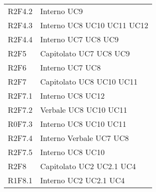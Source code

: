 \begin{center}
\begin{longtable}{  p{5cm} p{5cm} }
		R2F4.2 & Interno \newline UC9 \\
		R2F4.3 & Interno \newline UC8 \newline UC10 \newline UC11 \newline UC12 \\
		R2F4.4 & Interno \newline UC7 \newline UC8 \newline UC9 \\
		R2F5 & Capitolato \newline UC7 \newline UC8 \newline UC9 \\
		R2F6 & Interno \newline UC7 \newline UC8 \\
		R2F7 & Capitolato \newline UC8 \newline UC10 \newline UC11 \\
		R2F7.1 & Interno \newline UC8 \newline UC12 \\
		R2F7.2 & Verbale \newline UC8 \newline UC10 \newline UC11 \\
		R0F7.3 & Interno \newline UC8 \newline UC10 \newline UC11 \\
		R2F7.4 & Interno \newline Verbale \newline UC7 \newline UC8 \\
		R2F7.5 & Interno \newline UC8 \newline UC10 \\
		R2F8 & Capitolato \newline UC2 \newline UC2.1 \newline UC4 \\
		R1F8.1 & Interno \newline UC2 \newline UC2.1 \newline UC4 \\

\end{longtable}
\end{center}
